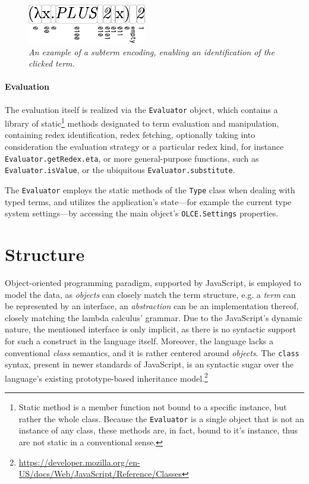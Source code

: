 \documentclass[table, a4paper, 10pt]{book}
\begin{document}
\begin{figure}[H]\centering
\includegraphics[scale=1.63]{encoding.pdf}
\caption{\textit{An example of a subterm encoding, enabling an identification of the clicked term.}}\label{encoding}
\end{figure}

\paragraph{Evaluation}
The evaluation itself is realized via the \texttt{Evaluator} object, which contains a library of
static\footnote{Static method is a member function not bound to a specific instance, but rather the whole class. Because
the \texttt{Evaluator} is a single object that is not an instance of any class, these methods are, in fact, bound to it's instance, thus are not
static in a conventional sense.} methods designated to term evaluation and manipulation,
containing redex identification, redex fetching, optionally taking into consideration
the evaluation strategy or a particular redex kind, for
instance \texttt{Evaluator.getRedex.eta}, or more general-purpose
functions, such as \texttt{Evaluator.isValue}, or the ubiquitous \texttt{Evaluator.substitute}.

The \texttt{Evaluator} employs the static methods of the \texttt{Type} class when dealing
with typed terms, and utilizes the application's
state---for example the current type system settings---by accessing
the main object's \texttt{OLCE.Settings} properties.

\section{Structure}
Object-oriented programming paradigm, supported by JavaScript, is employed
to model the data, as \textit{objects} can closely match the term structure,
e.g. a \textit{term} can be represented by an interface, an \textit{abstraction} can
be an implementation thereof, closely matching the lambda calculus' grammar.
Due to the JavaScript's dynamic nature, the mentioned interface is only implicit,
as there is no syntactic support for such a construct in the language itself.
Moreover, the language lacks a conventional \textit{class} semantics, and
it is rather centered around \textit{objects}. The \texttt{class} syntax,
present in newer standards of JavaScript, is
an syntactic sugar over the language's existing prototype-based
inheritance model.\footnote{\url{https://developer.mozilla.org/en-US/docs/Web/JavaScript/Reference/Classes}}
\end{document}
